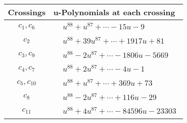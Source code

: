 \documentclass[1p]{elsarticle_modified}
\theoremstyle{definition}
\begin{document}
\begin{tabular}{m{50pt}|m{274pt}}
Crossings & \hspace{64pt}u-Polynomials at each crossing \\
\hline $$\begin{aligned}c_{1},c_{6}\end{aligned}$$&$\begin{aligned}
&u^{88}+u^{87}+\cdots-15 u-9
\end{aligned}$\\
\hline $$\begin{aligned}c_{2}\end{aligned}$$&$\begin{aligned}
&u^{88}+39 u^{87}+\cdots+1917 u+81
\end{aligned}$\\
\hline $$\begin{aligned}c_{3},c_{9}\end{aligned}$$&$\begin{aligned}
&u^{88}-2 u^{87}+\cdots-1806 u-5669
\end{aligned}$\\
\hline $$\begin{aligned}c_{4},c_{7}\end{aligned}$$&$\begin{aligned}
&u^{88}+2 u^{87}+\cdots-4 u-1
\end{aligned}$\\
\hline $$\begin{aligned}c_{5},c_{10}\end{aligned}$$&$\begin{aligned}
&u^{88}+u^{87}+\cdots+369 u+73
\end{aligned}$\\
\hline $$\begin{aligned}c_{8}\end{aligned}$$&$\begin{aligned}
&u^{88}-2 u^{87}+\cdots+116 u-29
\end{aligned}$\\
\hline $$\begin{aligned}c_{11}\end{aligned}$$&$\begin{aligned}
&u^{88}+4 u^{87}+\cdots-84596 u-23303
\end{aligned}$\\
\hline
\end{tabular}\\~\\
\newpage\renewcommand{\arraystretch}{1}
\end{document}
